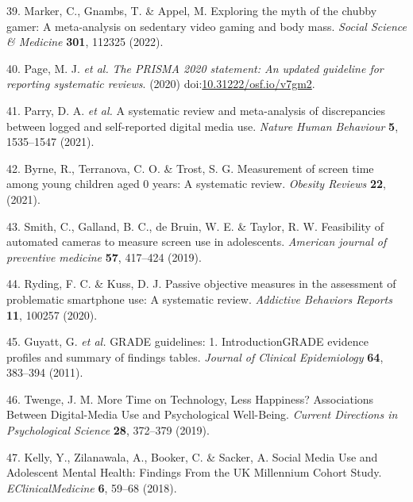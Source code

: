 \documentclass[
  english,
  man]{apa6}
\newenvironment{cslreferences}%
  {}%
  {\par}
\begin{document}
\begin{cslreferences}
\leavevmode\hypertarget{ref-markerExploringMythChubby2022}{}%
39. Marker, C., Gnambs, T. \& Appel, M. Exploring the myth of the chubby gamer: A meta-analysis on sedentary video gaming and body mass. \emph{Social Science \& Medicine} \textbf{301}, 112325 (2022).

\leavevmode\hypertarget{ref-pagePRISMA2020Statement2020}{}%
40. Page, M. J. \emph{et al.} \emph{The PRISMA 2020 statement: An updated guideline for reporting systematic reviews}. (2020) doi:\href{https://doi.org/10.31222/osf.io/v7gm2}{10.31222/osf.io/v7gm2}.

\leavevmode\hypertarget{ref-parrySystematicReviewMetaanalysis2021}{}%
41. Parry, D. A. \emph{et al.} A systematic review and meta-analysis of discrepancies between logged and self-reported digital media use. \emph{Nature Human Behaviour} \textbf{5}, 1535--1547 (2021).

\leavevmode\hypertarget{ref-byrneMeasurementScreenTime2021}{}%
42. Byrne, R., Terranova, C. O. \& Trost, S. G. Measurement of screen time among young children aged 0 years: A systematic review. \emph{Obesity Reviews} \textbf{22}, (2021).

\leavevmode\hypertarget{ref-smithFeasibilityAutomatedCameras2019}{}%
43. Smith, C., Galland, B. C., de Bruin, W. E. \& Taylor, R. W. Feasibility of automated cameras to measure screen use in adolescents. \emph{American journal of preventive medicine} \textbf{57}, 417--424 (2019).

\leavevmode\hypertarget{ref-rydingPassiveObjectiveMeasures2020}{}%
44. Ryding, F. C. \& Kuss, D. J. Passive objective measures in the assessment of problematic smartphone use: A systematic review. \emph{Addictive Behaviors Reports} \textbf{11}, 100257 (2020).

\leavevmode\hypertarget{ref-guyattGRADEGuidelinesIntroduction2011}{}%
45. Guyatt, G. \emph{et al.} GRADE guidelines: 1. IntroductionGRADE evidence profiles and summary of findings tables. \emph{Journal of Clinical Epidemiology} \textbf{64}, 383--394 (2011).

\leavevmode\hypertarget{ref-twengeMoreTimeTechnology2019}{}%
46. Twenge, J. M. More Time on Technology, Less Happiness? Associations Between Digital-Media Use and Psychological Well-Being. \emph{Current Directions in Psychological Science} \textbf{28}, 372--379 (2019).

\leavevmode\hypertarget{ref-kellySocialMediaUse2018}{}%
47. Kelly, Y., Zilanawala, A., Booker, C. \& Sacker, A. Social Media Use and Adolescent Mental Health: Findings From the UK Millennium Cohort Study. \emph{EClinicalMedicine} \textbf{6}, 59--68 (2018).


\end{cslreferences}
\end{document}

